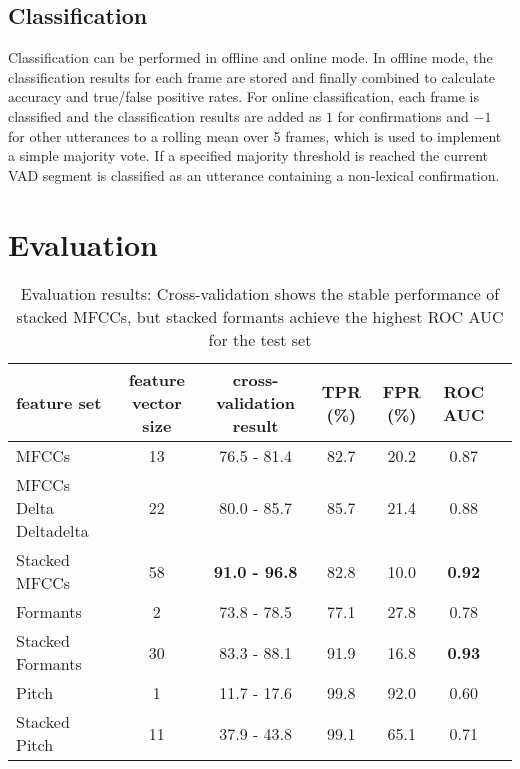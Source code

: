 \documentclass[letterpaper]{article}
\begin{document}
\subsection{Classification}\label{sec:classification}
Classification can be performed in offline and online mode.
In offline mode, the classification results for each frame are stored and finally combined to calculate accuracy and true/false positive rates.
For online classification, each frame is classified and the classification results are added as $1$ for confirmations and $-1$ for other utterances to a rolling mean over 5 frames, which is used to implement a simple majority vote. If a specified majority threshold is reached the current VAD segment is classified as an utterance containing a non-lexical confirmation.
\section{Evaluation}
\begin{table*}[t]
	\centering
	\begin{tabular}{l*{6}{c}}
		\hline
		feature set & feature vector size & cross-validation result & TPR (\%) & FPR (\%) & ROC AUC \\
		\hline
		MFCCs & 13 & 76.5 - 81.4 & 82.7 & 20.2 & 0.87\\
		MFCCs Delta Deltadelta & 22 & 80.0 - 85.7 & 85.7 & 21.4 & 0.88 \\
		Stacked MFCCs & 58 & \textbf{91.0 - 96.8} & 82.8 & 10.0 & \textbf{0.92} \\
		Formants & 2 & 73.8 - 78.5 & 77.1 & 27.8 & 0.78\\
		Stacked Formants & 30 & 83.3 - 88.1 & 91.9 & 16.8 & \textbf{0.93} \\
		Pitch & 1 & 11.7 - 17.6 & 99.8 & 92.0 & 0.60\\
		Stacked Pitch & 11 & 37.9 - 43.8 & 99.1 & 65.1 & 0.71 \\
		\hline
	\end{tabular}
	\caption{Evaluation results: Cross-validation shows the stable performance of stacked MFCCs, but stacked formants achieve the highest ROC AUC for the test set}
	\label{tab:eval-results}
\end{table*}
\end{document}
